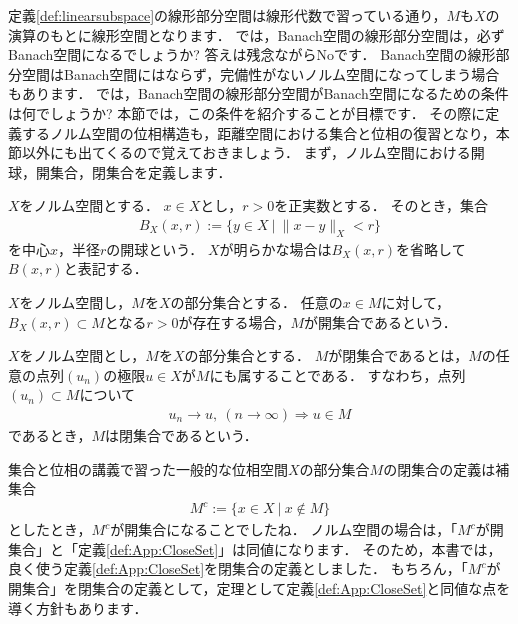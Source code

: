 定義\ref{def:linearsubspace}の線形部分空間は線形代数で習っている通り，$M$も$X$の演算のもとに線形空間となります．
では，Banach空間の線形部分空間は，必ずBanach空間になるでしょうか?
答えは残念ながらNoです．
Banach空間の線形部分空間はBanach空間にはならず，完備性がないノルム空間になってしまう場合もあります．
では，Banach空間の線形部分空間がBanach空間になるための条件は何でしょうか?
本節では，この条件を紹介することが目標です．
その際に定義するノルム空間の位相構造も，距離空間における集合と位相の復習となり，本節以外にも出てくるので覚えておきましょう．
まず，ノルム空間における開球，開集合，閉集合を定義します．

\begin{defi}[ノルム空間の開球]\label{def:App:OpenBall}
	$X$をノルム空間とする．
	$x \in X$とし，$r > 0$を正実数とする．
	そのとき，集合
	\begin{align*}
		B_X(x, r) := \{ y \in X ~ | ~ \| x - y \|_{X} < r \}
	\end{align*}
	を中心$x$，半径$r$の開球という．
	$X$が明らかな場合は$B_X(x, r)$を省略して$B(x, r)$と表記する．
\end{defi}

\begin{defi}[ノルム空間の開集合]\label{def:App:OpenSet}
	$X$をノルム空間し，$M$を$X$の部分集合とする．
	任意の$x \in M$に対して，$B_X(x, r) \subset M$となる$r > 0$が存在する場合，$M$が開集合であるという．
\end{defi}

\begin{defi}[ノルム空間の閉集合]\label{def:App:CloseSet}
	$X$をノルム空間とし，$M$を$X$の部分集合とする．
	$M$が閉集合であるとは，$M$の任意の点列$(u_n)$の極限$u \in X$が$M$にも属することである．
	すなわち，点列$(u_n) \subset M$について
	\begin{align*}
		u_n \rightarrow u, ~(n \rightarrow \infty) \Rightarrow u \in M 
	\end{align*}
	であるとき，$M$は閉集合であるという．
\end{defi}

集合と位相の講義で習った一般的な位相空間$X$の部分集合$M$の閉集合の定義は補集合
\begin{align*}
	M^{c} := \{ x \in X ~ | ~ x \not\in M \}
\end{align*}
としたとき，$M^{c}$が開集合になることでしたね．
ノルム空間の場合は，「$M^{c}$が開集合」と「定義\ref{def:App:CloseSet}」は同値になります．
そのため，本書では，良く使う定義\ref{def:App:CloseSet}を閉集合の定義としました．
もちろん，「$M^{c}$が開集合」を閉集合の定義として，定理として定義\ref{def:App:CloseSet}と同値な点を導く方針もあります．


